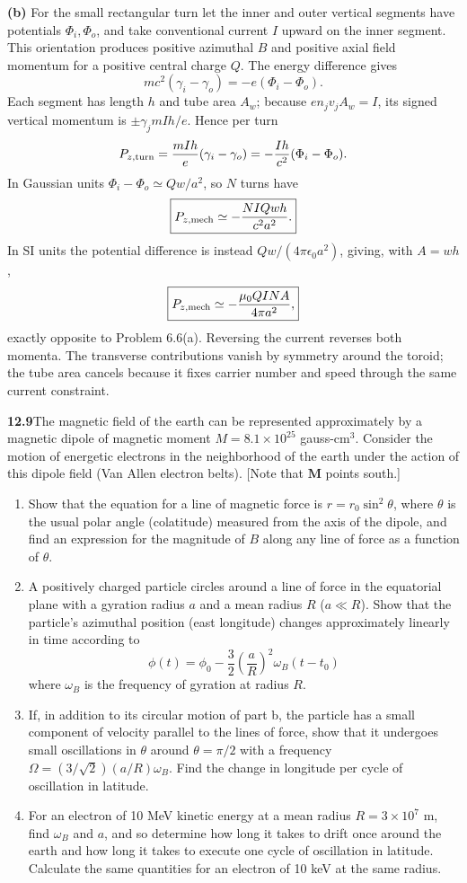 \medskip\noindent\textbf{(b)} For the small rectangular turn let the inner and outer vertical
segments have potentials $\Phi_i,\Phi_o$, and take conventional
current $I$ upward on the inner segment.  This orientation produces
positive azimuthal $B$ and positive axial field momentum for a
positive central charge $Q$.  The energy difference gives
\[
mc^2(\gamma_i-\gamma_o)=-e(\Phi_i-\Phi_o).
\]
Each segment has length $h$ and tube area $A_w$; because
$en_jv_jA_w=I$, its signed vertical momentum is
$\pm\gamma_jm I h/e$.  Hence per turn
\[
P_{z,\rm turn}=\frac{mIh}{e}(\gamma_i-\gamma_o)
=-\frac{Ih}{c^2}(\Phi_i-\Phi_o).
\]
In Gaussian units $\Phi_i-\Phi_o\simeq Qw/a^2$, so $N$ turns
have
\[
\boxed{P_{z,\rm mech}\simeq-\frac{N I Qwh}{c^2a^2}.}
\]
In SI units the potential difference is instead
$Qw/(4\pi\epsilon_0a^2)$, giving, with $A=wh$,
\[
\boxed{P_{z,\rm mech}\simeq-\frac{\mu_0QINA}{4\pi a^2},}
\]
exactly opposite to Problem 6.6(a).  Reversing the current reverses
both momenta.  The transverse contributions vanish by symmetry
around the toroid; the tube area cancels because it fixes carrier
number and speed through the same current constraint.

\par\bigskip
\noindent\textbf{12.9}\quad The magnetic field of the earth can be represented approximately by a magnetic dipole of magnetic moment $M=8.1\times10^{25}$ gauss-cm$^{3}$. Consider the motion of energetic electrons in the neighborhood of the earth under the action of this dipole field (Van Allen electron belts). [Note that $\mathbf{M}$ points south.]
\begin{enumerate}
\item[(a)] Show that the equation for a line of magnetic force is $r=r_{0}\sin^{2}\theta$, where $\theta$ is the usual polar angle (colatitude) measured from the axis of the dipole, and find an expression for the magnitude of $B$ along any line of force as a function of $\theta$.
\item[(b)] A positively charged particle circles around a line of force in the equatorial plane with a gyration radius $a$ and a mean radius $R$ ($a\ll R$). Show that the particle's azimuthal position (east longitude) changes approximately linearly in time according to
\[
\phi(t)=\phi_{0}-\frac{3}{2}\left(\frac{a}{R}\right)^{2}\!\omega_{B}(t-t_{0})
\]
where $\omega_{B}$ is the frequency of gyration at radius $R$.
\item[(c)] If, in addition to its circular motion of part b, the particle has a small component of velocity parallel to the lines of force, show that it undergoes small oscillations in $\theta$ around $\theta=\pi/2$ with a frequency $\Omega=(3/\sqrt{2})(a/R)\omega_{B}$. Find the change in longitude per cycle of oscillation in latitude.
\item[(d)] For an electron of 10 MeV kinetic energy at a mean radius $R=3\times10^{7}$ m, find $\omega_{B}$ and $a$, and so determine how long it takes to drift once around the earth and how long it takes to execute one cycle of oscillation in latitude. Calculate the same quantities for an electron of 10 keV at the same radius.
\end{enumerate}
\solution

